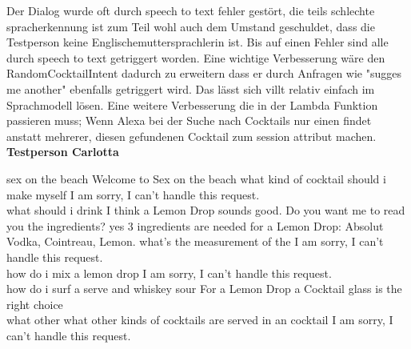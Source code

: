 \documentclass[12pt,letterpaper]{article}
\begin{document}
Der Dialog wurde oft durch speech to text fehler gestört, die teils schlechte spracherkennung ist zum Teil wohl auch dem Umstand geschuldet, dass die Testperson keine Englischemuttersprachlerin ist.
Bis auf einen Fehler sind alle durch speech to text getriggert worden.
Eine wichtige Verbesserung wäre den RandomCocktailIntent dadurch zu erweitern dass er durch Anfragen wie "sugges me another" ebenfalls getriggert wird. Das lässt sich villt relativ einfach im Sprachmodell lösen.
Eine weitere Verbesserung die in der Lambda Funktion passieren muss; Wenn Alexa bei der Suche nach Cocktails nur einen findet anstatt mehrerer, diesen gefundenen Cocktail zum session attribut machen. \\

\textbf{Testperson Carlotta}
\begin{dialogue}
	 sex on the beach
	 Welcome to Sex on the beach
	 what kind of cocktail should i make myself
	 I am sorry, I can't handle this request. \\
	 what should i drink
	 I think a Lemon Drop sounds good. Do you want me to read you the ingredients?
	 yes
	 3 ingredients are needed for a Lemon Drop: Absolut Vodka, Cointreau, Lemon.
	 what's the measurement of the
	 I am sorry, I can't handle this request. \\
	 how do i mix a lemon drop
	 I am sorry, I can't handle this request. \\
	 how do i surf a serve and whiskey sour
	 For a Lemon Drop a Cocktail glass is the right choice \\
	 what other what other kinds of cocktails are served in an cocktail
	 I am sorry, I can't handle this request. \\

\end{dialogue}
\end{document}
